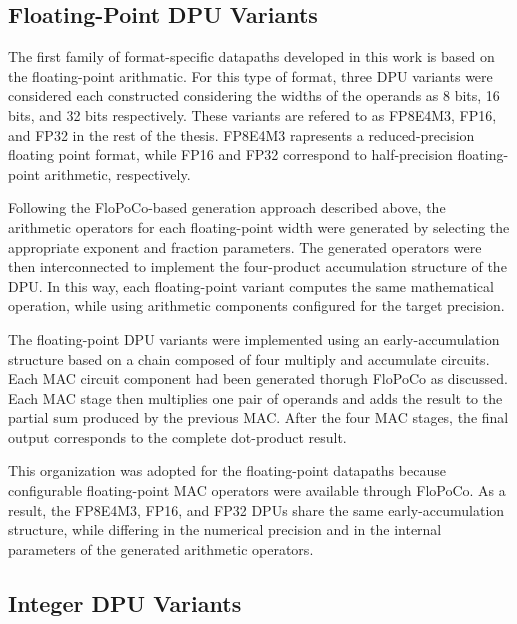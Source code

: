 \subsection{Floating-Point DPU Variants}

The first family of format-specific datapaths developed in this work is based on the floating-point arithmatic. For this type of format, three DPU variants were considered each constructed considering the widths of the operands as 8 bits, 16 bits, and 32 bits respectively. These variants are refered to as FP8E4M3,  FP16, and FP32 in the rest of the thesis. FP8E4M3 rapresents a reduced-precision floating point format, while FP16 and FP32 correspond to half-precision floating-point arithmetic, respectively. 

Following the FloPoCo-based generation approach described above, the arithmetic operators for each floating-point width were generated by selecting the appropriate exponent and fraction parameters. The generated operators were then interconnected to implement the four-product accumulation structure of the DPU. In this way, each floating-point variant computes the same mathematical operation, while using arithmetic components configured for the target precision.

The floating-point DPU variants were implemented using an early-accumulation structure based on a chain composed of four multiply and accumulate circuits. Each MAC circuit component had been generated thorugh FloPoCo as discussed. Each MAC stage then multiplies one pair of operands and adds the result to the partial sum produced by the previous MAC. After the four MAC stages, the final output corresponds to the complete dot-product result.

This organization was adopted for the floating-point datapaths because configurable floating-point MAC operators were available through FloPoCo. As a result, the FP8E4M3, FP16, and FP32 DPUs share the same early-accumulation structure, while differing in the numerical precision and in the internal parameters of the generated arithmetic operators.

\subsection{Integer DPU Variants}

